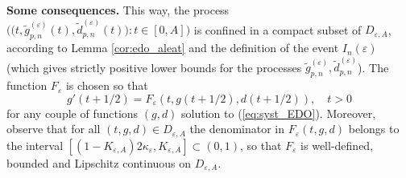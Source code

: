 \documentclass[a4, 11pt]{article}
\numberwithin{equation}{section}
\theoremstyle{plain}
\theoremstyle{definition}
\theoremstyle{remark}
\begin{document}
\bigskip

\textbf{Some consequences.} This way, the process $\big(\big(t,\tilde{g}_{p,n}^{(\varepsilon)}(t),\tilde{d}_{p,n}^{(\varepsilon)}(t)\big):t\in \left[0,A\right]\big)$ is confined in a compact subset of $D_{\varepsilon,A}$, according to Lemma \ref{cor:edo_aleat} and the definition of the event $I_n(\varepsilon)$ (which gives strictly positive lower bounds for the processes $\tilde{g}_{p,n}^{(\varepsilon)},\tilde{d}_{p,n}^{(\varepsilon)}$).
The function $F_{\varepsilon}$ is chosen so that $$g'(t+1/2)=F_{\varepsilon}\left(t,g(t+1/2),d(t+1/2)\right),\quad t>0$$ for any couple of functions $(g,d)$ solution to (\ref{eq:syst_EDO}). Moreover, observe that for all $(t,g,d)\in D_{\varepsilon,A}$ the denominator in $F_{\varepsilon}(t,g,d)$ belongs to the interval $\left[(1-K_{\varepsilon,A})2 \kappa_{\varepsilon},K_{\varepsilon,A}\right] \subset (0,1)$,  so that $F_{\varepsilon}$ is well-defined, bounded and Lipschitz continuous on $D_{\varepsilon,A}$. 
\end{document}
